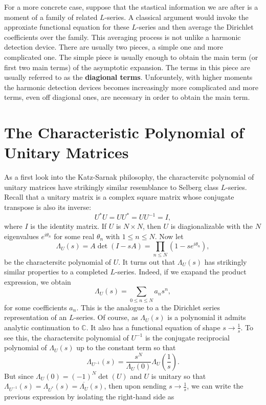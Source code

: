 \documentclass[12pt]{book}
\theoremstyle{definition}\newframedtheorem{method}{Method}
\newcommand{\C}{\mathbb{C}}
\renewcommand{\t}{\theta}
\renewcommand{\L}{\Lambda}
\newcommand{\x}{\times}
\newcommand{\<}{\langle}
\renewcommand{\>}{\rangle}
\newcommand{\conj}{\overline}
\begin{document}
      For a more concrete case, suppose that the stastical information we are after is a moment of a family of related $L$-series. A classical argument would invoke the approxiate functional equation for these $L$-series and then average the Dirichlet coefficients over the family. This averaging process is not unlike a harmonic detection device. There are usually two pieces, a simple one and more complicated one. The simple piece is usually enough to obtain the main term (or first two main terms) of the asymptotic expansion. The terms in this piece are usually referred to as the \textbf{diagional terms}. Unforuntely, with higher moments the harmonic detection devices becomes increasingly more complicated and more terms, even off diagional ones, are necessary in order to obtain the main term.
      \section{The Characteristic Polynomial of Unitary Matrices}
        As a first look into the Katz-Sarnak philosophy, the charactersitc polynomial of unitary matrices have strikingly similar resemblance to Selberg class $L$-series. Recall that a unitary matrix is a complex square matrix whose conjugate transpose is also its inverse:
        \[
          U^{\ast}U = UU^{\ast} = UU^{-1} = I,
        \]
        where $I$ is the identity matrix. If $U$ is $N \x N$, then $U$ is diagionalizable with the $N$ eigenvalues $e^{i\t_{n}}$ for some real $\t_{n}$ with $1 \le n \le N$. Now let
        \[
          \L_{U}(s) = A\det(I-sA) = \prod_{n \le N}(1-se^{i\t_{n}}),
        \]
        be the charactersitc polynomial of $U$. It turns out that $\L_{U}(s)$ has strikingly similar properties to a completed $L$-series. Indeed, if we exapand the product expression, we obtain
        \[
          \L_{U}(s) = \sum_{0 \le n \le N}a_{n}s^{n},
        \]
        for some coefficients $a_{n}$. This is the analogue to a the Dirichlet series representation of an $L$-series. Of course, as $\L_{U}(s)$ is a polynomial it admits analytic continuation to $\C$. It also has a functional equation of shape $s \to \frac{1}{s}$. To see this, the charactersitc polynomial of $U^{-1}$ is the conjugate reciprocial polynomial of $\L_{U}(s)$ up to the constant term so that
        \[
          \L_{U^{-1}}(s) = \frac{s^{N}}{\L_{U}(0)}\L_{U}\left(\frac{1}{s}\right).
        \]
        But since $\L_{U}(0) = (-1)^{N}\det(U)$ and $U$ is unitary so that $\L_{U^{-1}}(s) = \L_{U^{\ast}}(s) = \conj{\L_{U}}(s)$, then upon sending $s \to \frac{1}{s}$, we can write the previous expression by isolating the right-hand side as
\end{document}

